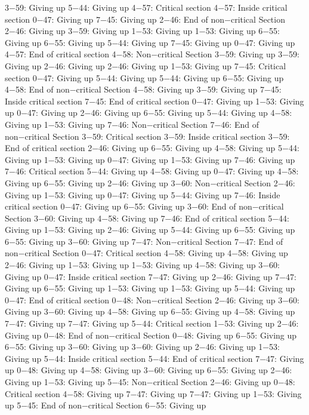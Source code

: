 3−59: Giving up
5−44: Giving up
4−57: Critical section
4−57: Inside critical section
0−47: Giving up
7−45: Giving up
2−46: End of non−critical Section
2−46: Giving up
3−59: Giving up
1−53: Giving up
1−53: Giving up
6−55: Giving up
6−55: Giving up
5−44: Giving up
7−45: Giving up
0−47: Giving up
4−57: End of critical section
4−58: Non−critical Section
3−59: Giving up
3−59: Giving up
2−46: Giving up
2−46: Giving up
1−53: Giving up
7−45: Critical section
0−47: Giving up
5−44: Giving up
5−44: Giving up
6−55: Giving up
4−58: End of non−critical Section
4−58: Giving up
3−59: Giving up
7−45: Inside critical section
7−45: End of critical section
0−47: Giving up
1−53: Giving up
0−47: Giving up
2−46: Giving up
6−55: Giving up
5−44: Giving up
4−58: Giving up
1−53: Giving up
7−46: Non−critical Section
7−46: End of non−critical Section
3−59: Critical section
3−59: Inside critical section
3−59: End of critical section
2−46: Giving up
6−55: Giving up
4−58: Giving up
5−44: Giving up
1−53: Giving up
0−47: Giving up
1−53: Giving up
7−46: Giving up
7−46: Critical section
5−44: Giving up
4−58: Giving up
0−47: Giving up
4−58: Giving up
6−55: Giving up
2−46: Giving up
3−60: Non−critical Section
2−46: Giving up
1−53: Giving up
0−47: Giving up
5−44: Giving up
7−46: Inside critical section
0−47: Giving up
6−55: Giving up
3−60: End of non−critical Section
3−60: Giving up
4−58: Giving up
7−46: End of critical section
5−44: Giving up
1−53: Giving up
2−46: Giving up
5−44: Giving up
6−55: Giving up
6−55: Giving up
3−60: Giving up
7−47: Non−critical Section
7−47: End of non−critical Section
0−47: Critical section
4−58: Giving up
4−58: Giving up
2−46: Giving up
1−53: Giving up
1−53: Giving up
4−58: Giving up
3−60: Giving up
0−47: Inside critical section
7−47: Giving up
2−46: Giving up
7−47: Giving up
6−55: Giving up
1−53: Giving up
1−53: Giving up
5−44: Giving up
0−47: End of critical section
0−48: Non−critical Section
2−46: Giving up
3−60: Giving up
3−60: Giving up
4−58: Giving up
6−55: Giving up
4−58: Giving up
7−47: Giving up
7−47: Giving up
5−44: Critical section
1−53: Giving up
2−46: Giving up
0−48: End of non−critical Section
0−48: Giving up
6−55: Giving up
6−55: Giving up
3−60: Giving up
3−60: Giving up
2−46: Giving up
1−53: Giving up
5−44: Inside critical section
5−44: End of critical section
7−47: Giving up
0−48: Giving up
4−58: Giving up
3−60: Giving up
6−55: Giving up
2−46: Giving up
1−53: Giving up
5−45: Non−critical Section
2−46: Giving up
0−48: Critical section
4−58: Giving up
7−47: Giving up
7−47: Giving up
1−53: Giving up
5−45: End of non−critical Section
6−55: Giving up
